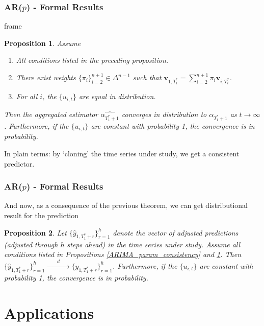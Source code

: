 \documentclass[9pt]{beamer}
\newcommand{\weight}{\pi}
\newtheorem{prop}{Proposition}
\theoremstyle{definition}
\begin{document}
\begin{frame}\frametitle{AR($p$) - Formal Results} 

    frame
\begin{prop}\label{ARIMA_aggregated_alpha}
Assume
  \begin{enumerate}
    \item All conditions listed in the preceding proposition.
    \item There exist weights $\{\pi_{i}\}_{i=2}^{n+1} \in \Delta^{n-1}$  such that $\textbf{v}_{1,T_{1}^{*}} = \sum^{n+1}_{i=2}\weight_{i} \textbf{v}_{i,T_{i}^{*}}$.
    \item For all $i$, the $\{u_{i,t}\}$ are equal in distribution.
   \end{enumerate}

   Then the aggregated estimator $\hat{\alpha_{T^{*}_{1}+1}}$ converges in distribution to $\alpha_{T^{*}_{1}+1}$ as $t \rightarrow \infty$.  Furthermore, if the $\{u_{i,t}\}$ are constant with probability 1, the convergence is in probability.
  \end{prop}

  In plain terms: by `cloning' the time series under study, we get a consistent predictor.

\end{frame}


\begin{frame}\frametitle{AR($p$) - Formal Results} 

    And now, as a consequence of the previous theorem, we can get distributional result for the prediction

\begin{prop}\label{ARIMA_conv_distribution}
  Let $\{\hat y_{1,T_{1}^{*}+r}\}^{h}_{r=1}$ denote the vector of adjusted predictions (adjusted through $h$ steps ahead) in the time series under study.  Assume all conditions listed in Propositions \ref{ARIMA_param_consistency} and \ref{ARIMA_aggregated_alpha}.  Then $\{\hat y_{1,T_{1}^{*}+r}\}^{h}_{r=1} \xrightarrow{\qquad d\qquad} \{ y_{1,T_{1}^{*}+r}\}^{h}_{r=1}$.  Furthermore, if the $\{u_{i,t}\}$ are constant with probability 1, the convergence is in probability. 
  \end{prop}

\end{frame}

\section{Applications}
\end{document}
